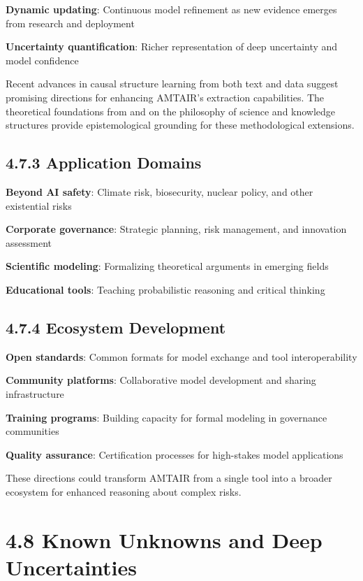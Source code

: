 \documentclass[
  11pt,
  letterpaper,
  openany]{book}
\begin{document}
\textbf{Dynamic updating}: Continuous model refinement as new evidence
emerges from research and deployment

\textbf{Uncertainty quantification}: Richer representation of deep
uncertainty and model confidence

Recent advances in causal structure learning from both text and data
\textcite{babakov2025} \textcite{ban2023} \textcite{bethard2007}
\textcite{chen2023} \textcite{heinze-deml2018} \textcite{squires2023}
\textcite{yang2022} suggest promising directions for enhancing AMTAIR's
extraction capabilities. The theoretical foundations from
\textcite{duhem1954} and \textcite{meyer2022b} on the philosophy of
science and knowledge structures provide epistemological grounding for
these methodological extensions.

\subsection{4.7.3 Application Domains}\label{sec-application-future}

\textbf{Beyond AI safety}: Climate risk, biosecurity, nuclear policy,
and other existential risks

\textbf{Corporate governance}: Strategic planning, risk management, and
innovation assessment

\textbf{Scientific modeling}: Formalizing theoretical arguments in
emerging fields

\textbf{Educational tools}: Teaching probabilistic reasoning and
critical thinking

\subsection{4.7.4 Ecosystem Development}\label{sec-ecosystem-future}

\textbf{Open standards}: Common formats for model exchange and tool
interoperability

\textbf{Community platforms}: Collaborative model development and
sharing infrastructure

\textbf{Training programs}: Building capacity for formal modeling in
governance communities

\textbf{Quality assurance}: Certification processes for high-stakes
model applications

These directions could transform AMTAIR from a single tool into a
broader ecosystem for enhanced reasoning about complex risks.

\section{4.8 Known Unknowns and Deep
Uncertainties}\label{sec-deep-uncertainties}
\end{document}
